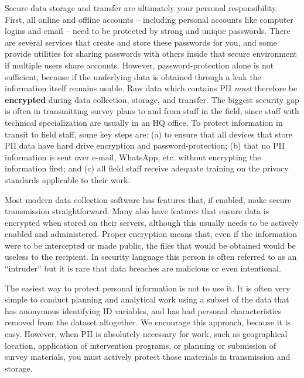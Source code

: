 Secure data storage and transfer are ultimately your personal responsibility.
First, all online and offline accounts
-- including personal accounts like computer logins and email --
need to be protected by strong and unique passwords.
There are several services that create and store these passwords for you,
and some provide utilities for sharing passwords with others
inside that secure environment if multiple users share accounts.
However, password-protection alone is not sufficient,
because if the underlying data is obtained through a leak the information itself remains usable.
Raw data which contains PII \textit{must} therefore be \textbf{encrypted}
during data collection, storage, and transfer.
The biggest security gap is often in transmitting survey plans to and from staff in the field,
since staff with technical specialization are usually in an HQ office.
To protect information in transit to field staff, some key steps are:
(a) to ensure that all devices that store PII data have hard drive encryption and password-protection;
(b) that no PII information is sent over e-mail, WhatsApp, etc. without encrypting the information first;
and (c) all field staff receive adequate training on the privacy standards applicable to their work.

Most modern data collection software has features that,
if enabled, make secure transmission straightforward.
Many also have features that ensure data is encrypted when stored on their servers,
although this usually needs to be actively enabled and administered.
Proper encryption means that,
even if the information were to be intercepted or made public,
the files that would be obtained would be useless to the recipient.
In security language this person is often referred to as an ``intruder''
but it is rare that data breaches are malicious or even intentional.

The easiest way to protect personal information is not to use it.
It is often very simple to conduct planning and analytical work
using a subset of the data that has anonymous identifying ID variables,
and has had personal characteristics removed from the dataset altogether.
We encourage this approach, because it is easy.
However, when PII is absolutely necessary for work,
such as geographical location, application of intervention programs,
or planning or submission of survey materials,
you must actively protect those materials in transmission and storage.

